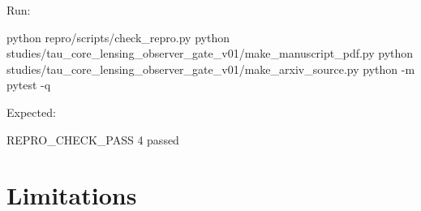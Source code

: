 \documentclass[11pt]{article}
\newenvironment{Shaded}{}{}
\newcommand{\AttributeTok}[1]{\textcolor[rgb]{0.49,0.56,0.16}{#1}}
\newcommand{\ExtensionTok}[1]{#1}
\newcommand{\NormalTok}[1]{#1}
\begin{document}
Run:

\begin{Shaded}
\begin{Highlighting}[]
\ExtensionTok{python}\NormalTok{ repro/scripts/check\_repro.py}
\ExtensionTok{python}\NormalTok{ studies/tau\_core\_lensing\_observer\_gate\_v01/make\_manuscript\_pdf.py}
\ExtensionTok{python}\NormalTok{ studies/tau\_core\_lensing\_observer\_gate\_v01/make\_arxiv\_source.py}
\ExtensionTok{python} \AttributeTok{{-}m}\NormalTok{ pytest }\AttributeTok{{-}q}
\end{Highlighting}
\end{Shaded}

Expected:

\begin{Shaded}
\begin{Highlighting}[]
\NormalTok{REPRO\_CHECK\_PASS}
\NormalTok{4 passed}
\end{Highlighting}
\end{Shaded}

\section{Limitations}\label{limitations}
\end{document}
